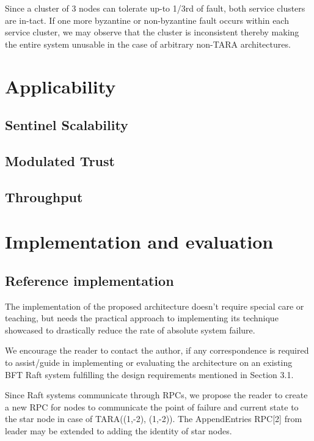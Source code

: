 \documentclass[]{article}
\begin{document}
Since a cluster of 3 nodes can tolerate up-to 1/3rd of fault, both service clusters are in-tact. If one more byzantine or non-byzantine fault occurs within each service cluster, we may observe that the cluster is inconsistent thereby making the entire system unusable in the case of arbitrary non-TARA architectures.


\section{Applicability}
\subsection{Sentinel Scalability}
\subsection{Modulated Trust}
\subsection{Throughput}

\section{Implementation and evaluation}
\subsection{Reference implementation}
The implementation of the proposed architecture doesn’t require special care or teaching, but needs the practical approach to implementing its technique showcased to drastically reduce the rate of absolute system failure. 

We encourage the reader to contact the author, if any correspondence is required to assist/guide in implementing or evaluating the architecture on an existing BFT Raft system fulfilling the design requirements mentioned in Section 3.1.

Since Raft systems communicate through RPCs, we propose the reader to create a new RPC for nodes to communicate the point of failure and current state to the star node in case of TARA((1,-2), (1,-2)). The AppendEntries RPC[2] from leader may be extended to adding the identity of star nodes.
\end{document}
